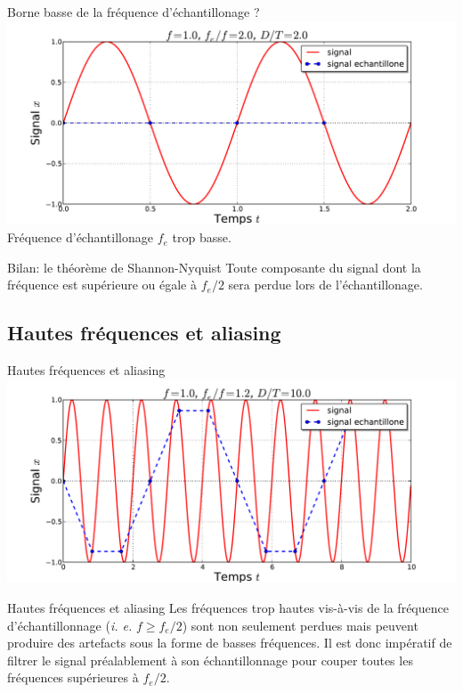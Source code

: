\documentclass[8pt,a4paper]{beamer}
\begin{document}
  \begin{frame}{Borne basse de la fréquence d'échantillonage ?}
  \includegraphics[width=1.\textwidth]{figures/echant_sin_2.pdf}\\
  \alert{Fréquence d'échantillonage $f_e$ trop basse.}
  \begin{alertblock}{Bilan: le théorème de Shannon-Nyquist}
  Toute composante du signal dont la fréquence est supérieure ou égale à $f_e/2$ sera perdue lors de l'échantillonage.
  \end{alertblock}
  \end{frame}
  \subsection{Hautes fréquences et aliasing}
  \begin{frame}{Hautes fréquences et aliasing}
  \includegraphics[width=1.\textwidth]{figures/echant_sin_6.pdf}\\
  \begin{alertblock}{Hautes fréquences et aliasing}
  Les fréquences trop hautes vis-à-vis de la fréquence d’échantillonnage (\textit{i. e.} $f\geq f_e/2$) sont non seulement perdues mais peuvent produire des artefacts sous la forme de basses fréquences. Il est donc impératif de filtrer le signal préalablement à son échantillonnage pour couper toutes les fréquences supérieures à $f_e/2$.
  \end{alertblock}
  \end{frame}
\end{document}
